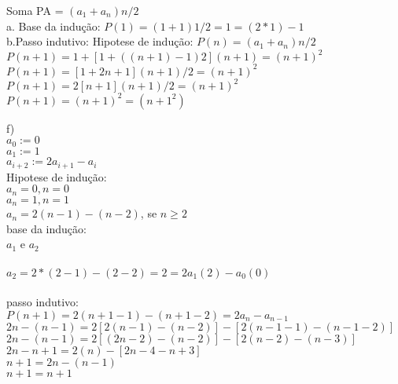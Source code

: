 \documentclass[a4paper, 10pt]{article}
\begin{document}
 Soma PA = $(a_1 + a_n)n/2$ \\
 
\noindent a. Base da indução: $P(1)= (1+1)1/2 = 1 = (2*1) - 1$ \checkmark \\

\noindent b.Passo indutivo: Hipotese de indução: $P(n) = (a_1 + a_n)n/2 $ \\

$P(n+1) = {1+[1+((n+1)-1)2](n+1)} = (n+1)^2$ \\

$P(n+1) = [1+2n+1](n+1)/2 = (n+1)^2$ \\

$P(n+1) = 2[n+1](n+1)/2 = (n+1)^2$ \\

$P(n+1) = (n+1)^2 = (n+1^2)$  \checkmark 



\noindent f)\\ 
            $a_0 := 0$ \\
            $a_1 := 1$ \\
            $a_{i+2} := 2a_{i+1} - a_i$\\
            
            Hipotese de indução:\\
                                $a_n = 0, n=0$\\ 
                                $a_n = 1, n=1$\\
                                $a_n = 2(n-1)-(n-2)$, se $n\geq2$\\
    base da indução:\\
                    $a_1$ e $a_2$ \checkmark \\
                    \\
                    $a_2 = 2*(2-1)-(2-2) = 2 = 2a_1(2) - a_0(0)$\checkmark\\
                    \\
    passo indutivo: \\
                    $P(n+1) = 2(n+1-1)-(n+1-2) = 2a_n - a_{n-1}$\\
                    $2n - (n-1) = 2[2(n-1)-(n-2)] - [2(n-1-1)-(n-1-2)]$\\
                    $2n - (n-1) = 2[(2n-2)-(n-2)] - [2(n-2)-(n-3)]$\\
                    $2n-n+1 = 2(n)-[2n-4-n+3]$\\
                    $n+1 = 2n - (n-1)$\\
                    $n+1 = n+1$\checkmark\\
    
\end{document}
